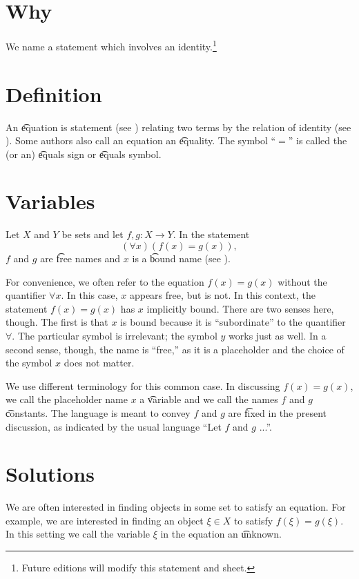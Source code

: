 
\section*{Why}

We name a statement which involves an identity.\footnote{Future editions will modify this statement and sheet.}

\section*{Definition}

An \t{equation} is statement (see ) relating two terms by the relation of identity (see ).
Some authors also call an equation an \t{equality}.
The symbol ``$=$'' is called the (or an) \t{equals sign} or \t{equals symbol}.

\section*{Variables}

Let $X$ and $Y$ be sets and let $f,g: X \to Y$.
In the statement
\[
(\forall x)(f(x) = g(x)),
\]
$f$ and $g$ are \t{free} names and $x$ is a \t{bound} name (see ).

For convenience, we often refer to the equation $f(x) = g(x)$ without the quantifier $\forall x$.
In this case, $x$ appears free, but is not.
In this context, the statement $f(x) = g(x)$ has $x$ implicitly bound.
There are two senses here, though.
The first is that $x$ is bound because it is ``subordinate'' to the quantifier $\forall$.
The particular symbol is irrelevant; the symbol $y$ works just as well.
In a second sense, though, the name is ``free,'' as it is a placeholder and the choice of the symbol $x$ does not matter.

We use different terminology for this common case.
In discussing $f(x) = g(x)$, we call the placeholder name $x$ a \t{variable} and we call the names $f$ and $g$ \t{constants}.
The language is meant to convey $f$ and $g$ are \t{fixed} in the present discussion, as indicated by the usual language ``Let $f$ and $g$ ...''.

\section*{Solutions}

We are often interested in finding objects in some set to satisfy an equation.
For example, we are interested in finding an object $\xi  \in X$ to satisfy $f(\xi ) = g(\xi )$.
In this setting we call the variable $\xi $ in the equation an \t{unknown}.

